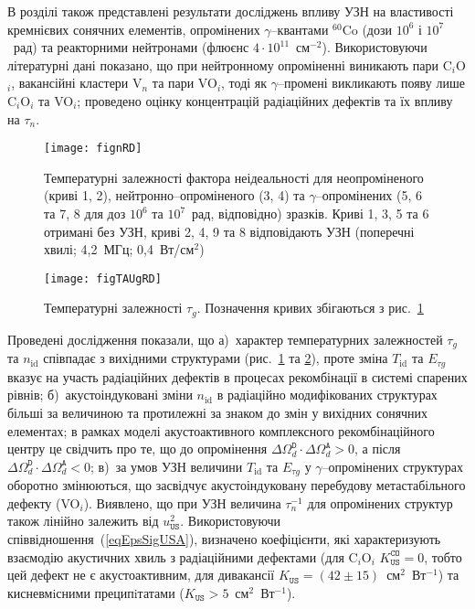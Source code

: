 В розділі також представлені результати досліджень впливу УЗН на властивості кремнієвих сонячних елементів,
опромінених $\gamma$--квантами $^{60}$Co (дози $10^6$ і $10^7$~рад) та реакторними нейтронами (флюєнс $4\cdot10^{11}$~см$^{-2}$).
Використовуючи літературні дані показано, що при нейтронному опроміненні виникають пари C$_i$O$_i$,
вакансійні кластери V$_n$ та пари VO$_i$, тоді як $\gamma$--промені викликають появу лише C$_i$O$_i$ та VO$_i$;
проведено оцінку концентрацій радіаційних дефектів та їх впливу на $\tau_n$.

\begin{figure}[ht]
\center
\texttt{[image: fignRD]}%
\caption{\label{fignRD}
Температурні залежності фактора неідеальності
для неопроміненого (криві 1, 2),
нейтронно--опроміненого (3, 4) та
$\gamma$--опромінених (5, 6 та 7, 8 для доз $10^6$ та $10^7$~рад, відповідно)
зразків.
Криві 1, 3, 5 та 6 отримані без УЗН,
криві 2, 4, 9 та 8 відповідають УЗН (поперечні хвилі; 4,2~МГц; 0,4~Вт/см$^2$)
}%
\end{figure}


\begin{figure}[t]
\center
\texttt{[image: figTAUgRD]}%
\caption{\label{figTAUgRD}
Температурні залежності $\tau_g$.
Позначення кривих збігаються з рис.~\ref{fignRD}
}%
\end{figure}

Проведені дослідження показали, що
а)~характер температурних залежностей  $\tau_{g}$ та $n_\mathrm{id}$ співпадає з вихідними структурами (рис.~\ref{fignRD} та \ref{figTAUgRD}), проте зміна $T_{\mathrm{id}}$ та $E_{\tau g}$ вказує на участь радіаційних дефектів в процесах рекомбінації в системі спарених рівнів;
б)~акустоіндуковані зміни $n_\mathrm{id}$ в радіаційно модифікованих структурах більші за величиною та протилежні за знаком до змін у вихідних сонячних елементах;
в рамках моделі акустоактивного комплексного рекомбінаційного центру це свідчить про те, що до опромінення $\Delta\Omega_d^\mathtt{D}\cdot\Delta\Omega_d^\mathtt{A}>0$, а після $\Delta\Omega_d^\mathtt{D}\cdot\Delta\Omega_d^\mathtt{A}<0$;
в)~за умов УЗН величини $T_{\mathrm{id}}$ та $E_{\tau g}$ у $\gamma$--опромінених структурах оборотно змінюються,
що засвідчує акустоіндуковану перебудову метастабільного дефекту (VO$_i$).
Виявлено, що при УЗН величина $\tau_n^{-1}$ для опромінених структур також лінійно залежить від $u_{\mathtt{US}}^2$.
Використовуючи співвідношення~(\ref{eqEpsSigUSA}), визначено коефіцієнти, які характеризують взаємодію акустичних хвиль з радіаційними дефектами (для C$_i$O$_i$ $K_\mathtt{US}^\mathtt{CO}=0$, тобто цей дефект не є акустоактивним,
для дивакансії $K_\mathtt{US}=(42\pm15)$~см$^2$~Вт$^{-1}$)
та кисневмiсними преципiтатами ($K_\mathtt{US}>5$~см$^2$~Вт$^{-1}$).

